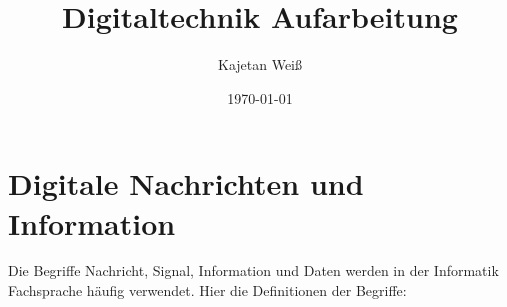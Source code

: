 %





\title{Digitaltechnik Aufarbeitung}
\author{Kajetan Weiß}
\date{\today}
\maketitle



\tableofcontents

\chapter{Digitale Nachrichten und Information}
Die Begriffe Nachricht, Signal, Information und Daten werden in der Informatik Fachsprache häufig verwendet. Hier die Definitionen der Begriffe:

